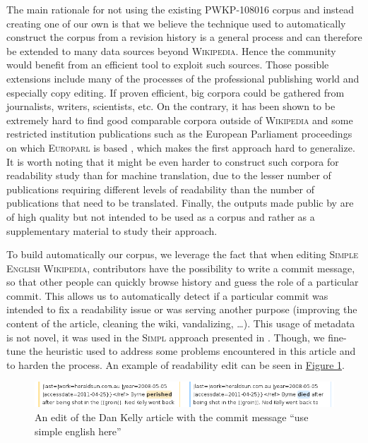 \documentclass[a4paper, 11pt, onepage]{scrreprt}
\newcommand\wiki{\textsc{Wikipedia}}
\newcommand\sew{\textsc{Simple English Wikipedia}}
\newcommand\figureref[1]{\hyperref[#1]{Figure \ref*{#1}}}
\begin{document}
The main rationale for not using the existing \textsc{PWKP-108016}
corpus and instead creating one of our own is that we believe the
technique used to automatically construct the corpus from a revision
history is a general process and can therefore be extended to many
data sources beyond \wiki. Hence the community would benefit from an
efficient tool to exploit such sources. Those possible extensions
include many of the processes of the professional publishing world and
especially copy editing. If proven efficient, big corpora could be
gathered from journalists, writers, scientists, etc. On the contrary,
it has been shown to be extremely hard to find good comparable corpora
outside of \wiki{} and some restricted institution publications such
as the European Parliament proceedings on which \textsc{Europarl} is
based \cite{koehn2005europarl}, which makes the first approach hard to
generalize. It is worth noting that it might be even harder to
construct such corpora for readability study than for machine
translation, due to the lesser number of publications requiring
different levels of readability than the number of publications that
need to be translated. Finally, the outputs made public by
\cite{yatskar2010sake} are of high quality but not intended to be used
as a corpus and rather as a supplementary material to study their
approach.

To build automatically our corpus, we leverage the fact that when
editing \sew, contributors have the possibility to write a commit
message, so that other people can quickly browse history and guess the
role of a particular commit. This allows us to automatically detect if
a particular commit was intended to fix a readability issue or was
serving another purpose (improving the content of the article,
cleaning the wiki, vandalizing, …). This usage of metadata is not
novel, it was used in the \textsc{Simpl} approach presented in
\cite{yatskar2010sake}. Though, we fine-tune the heuristic used to
address some problems encountered in this article and to harden the
process. An example of readability edit can be seen in
\figureref{fig:dan-kelly}.

\begin{figure}[H]
  \centering
  \includegraphics[width=\textwidth]{dan-kelly}
  \caption{An edit of the Dan Kelly article with the commit message
    “use simple english here”}
  \label{fig:dan-kelly}
\end{figure}
\end{document}
